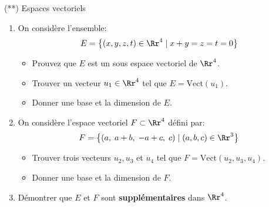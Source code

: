 \documentclass[exam]{cs188}
\begin{document}
\begin{problem}[6]{(**) Espaces vectoriels}
  \begin{enumerate}
      \item On considère l'ensemble:
          \begin{equation}
              E = \left\{ (x,y,z,t)\in\Rr^4\;|\; x+y=z=t=0\right\}
          \end{equation}
          \begin{itemize}
              \item Prouvez que $E$ est un sous espace vectoriel de $\Rr^4$.
              \item Trouver un vecteur $u_1\in \Rr^4$ tel que $E =
                  \text{Vect}(u_1)$.
              \item Donner une base et la dimension de $E$.
          \end{itemize}
      \item On considère l'espace vectoriel $F\subset \Rr^4$ défini par:
          \begin{equation}
              F = \left\{(a,\; a+b,\;-a+c,\;c)\;|\;(a,b,c)\in \Rr^3\right\}
          \end{equation}
          \begin{itemize}
              \item Trouver trois vecteurs $u_2, u_3$ et $u_4$ tel que
                  $F=\text{Vect}(u_2,u_3,u_4)$.
              \item Donner une base et la dimension de $F$.
          \end{itemize}
      \item Démontrer que $E$ et $F$ sont \textbf{supplémentaires} dans $\Rr^4$.
  \end{enumerate}  
\end{problem}
\end{document}
